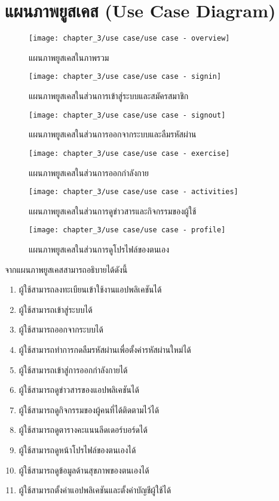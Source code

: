 \section{แผนภาพยูสเคส (Use Case Diagram)}
\begin{figure}
    \texttt{[image: chapter\_3/use case/use case - overview]}
    \caption{แผนภาพยูสเคสในภาพรวม}
\end{figure}
\begin{figure}
    \texttt{[image: chapter\_3/use case/use case - signin]}
    \caption{แผนภาพยูสเคสในส่วนการเข้าสู่ระบบและสมัครสมาชิก}
\end{figure}
\begin{figure}
    \texttt{[image: chapter\_3/use case/use case - signout]}
    \caption{แผนภาพยูสเคสในส่วนการออกจากระบบและลืมรหัสผ่าน}
\end{figure}
\begin{figure}
    \texttt{[image: chapter\_3/use case/use case - exercise]}
    \caption{แผนภาพยูสเคสในส่วนการออกกำลังกาย}
\end{figure}
\begin{figure}
    \texttt{[image: chapter\_3/use case/use case - activities]}
    \caption{แผนภาพยูสเคสในส่วนการดูข่าวสารและกิจกรรมของผู้ใช้}
\end{figure}
\begin{figure}
    \texttt{[image: chapter\_3/use case/use case - profile]}
    \caption{แผนภาพยูสเคสในส่วนการดูโปรไฟล์ของตนเอง}
\end{figure}
จากแผนภาพยูสเคสสามารถอธิบายได้ดังนี้
\begin{enumerate}
    \item ผู้ใช้สามารถลงทะเบียนเข้าใช้งานแอปพลิเคชันได้
    \item ผู้ใช้สามารถเข้าสู่ระบบได้
    \item ผู้ใช้สามารถออกจากระบบได้
    \item ผู้ใช้สามารถทำการกดลืมรหัสผ่านเพื่อตั้งค่ารหัสผ่านใหม่ได้
    \item ผู้ใช้สามารถเข้าสู่การออกกำลังกายได้
    \item ผู้ใช้สามารถดูข่าวสารของแอปพลิเคชันได้
    \item ผู้ใช้สามารถดูกิจกรรมของผู้คนที่ได้ติดตามไว้ได้
    \item ผู้ใช้สามารถดูตารางคะแนนลีดเดอร์บอร์ดได้
    \item ผู้ใช้สามารถดูหน้าโปรไฟล์ของตนเองได้
    \item ผู้ใช้สามารถดูข้อมูลด้านสุขภาพของตนเองได้
    \item ผู้ใช้สามารถตั้งค่าแอปพลิเคชันและตั้งค่าบัญชีผู้ใช้ได้
\end{enumerate}
\clearpage

